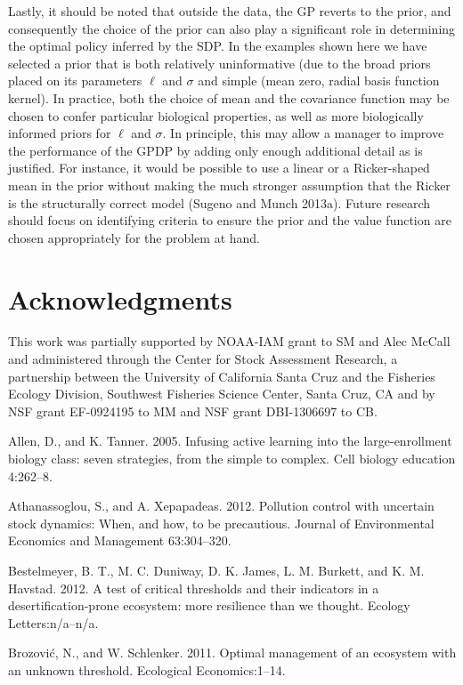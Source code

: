 \documentclass[author-year, 12pt,review]{components/elsarticle} %
\begin{document}
Lastly, it should be noted that outside the data, the GP reverts to the
prior, and consequently the choice of the prior can also play a
significant role in determining the optimal policy inferred by the SDP.
In the examples shown here we have selected a prior that is both
relatively uninformative (due to the broad priors placed on its
parameters $\ell$ and $\sigma$ and simple (mean zero, radial basis
function kernel). In practice, both the choice of mean and the
covariance function may be chosen to confer particular biological
properties, as well as more biologically informed priors for $\ell$ and
$\sigma$. In principle, this may allow a manager to improve the
performance of the GPDP by adding only enough additional detail as is
justified. For instance, it would be possible to use a linear or a
Ricker-shaped mean in the prior without making the much stronger
assumption that the Ricker is the structurally correct model (Sugeno and
Munch 2013a). Future research should focus on identifying criteria to
ensure the prior and the value function are chosen appropriately for the
problem at hand.

\section{Acknowledgments}\label{acknowledgments}

This work was partially supported by NOAA-IAM grant to SM and Alec
McCall and administered through the Center for Stock Assessment
Research, a partnership between the University of California Santa Cruz
and the Fisheries Ecology Division, Southwest Fisheries Science Center,
Santa Cruz, CA and by NSF grant EF-0924195 to MM and NSF grant
DBI-1306697 to CB.

Allen, D., and K. Tanner. 2005. Infusing active learning into the
large-enrollment biology class: seven strategies, from the simple to
complex. Cell biology education 4:262--8.

Athanassoglou, S., and A. Xepapadeas. 2012. Pollution control with
uncertain stock dynamics: When, and how, to be precautious. Journal of
Environmental Economics and Management 63:304--320.

Bestelmeyer, B. T., M. C. Duniway, D. K. James, L. M. Burkett, and K. M.
Havstad. 2012. A test of critical thresholds and their indicators in a
desertification-prone ecosystem: more resilience than we thought.
Ecology Letters:n/a--n/a.

Brozović, N., and W. Schlenker. 2011. Optimal management of an ecosystem
with an unknown threshold. Ecological Economics:1--14.
\end{document}
